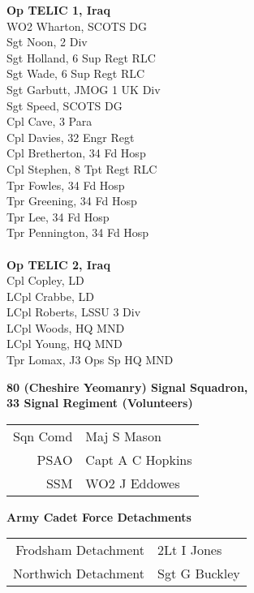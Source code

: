 \begin{multicols}{2}
  \small
  \noindent
  \textbf{Op TELIC 1, Iraq} \\
  WO2 Wharton, SCOTS DG \\
  Sgt Noon, 2 Div \\
  Sgt Holland, 6 Sup Regt RLC \\
  Sgt Wade, 6 Sup Regt RLC \\
  Sgt Garbutt, JMOG 1 UK Div \\
  Sgt Speed, SCOTS DG \\
  Cpl Cave, 3 Para \\
  Cpl Davies, 32 Engr Regt \\
  Cpl Bretherton, 34 Fd Hosp \\
  Cpl Stephen, 8 Tpt Regt RLC \\
  Tpr Fowles, 34 Fd Hosp \\
  Tpr Greening, 34 Fd Hosp \\
  Tpr Lee, 34 Fd Hosp \\
  Tpr Pennington, 34 Fd Hosp \\
  \\
  \textbf{Op TELIC 2, Iraq} \\
  Cpl Copley, LD \\
  LCpl Crabbe, LD \\
  LCpl Roberts, LSSU 3 Div \\
  LCpl Woods, HQ MND \\
  LCpl Young, HQ MND \\
  Tpr Lomax, J3 Ops Sp HQ MND \\
\end{multicols}

\pagebreak

\vspace*{10mm}

\begin{center}
  \Large
  \textbf{80 (Cheshire Yeomanry) Signal Squadron, \\ 33 Signal Regiment (Volunteers)}
\end{center}

\begin{center}
  \begin{tabular}{rl}
    Sqn Comd & Maj S Mason \\
    PSAO & Capt A C Hopkins \\
    SSM & WO2 J Eddowes \\
  \end{tabular}
\end{center}

\vspace*{10mm}

\begin{center}
  \Large
  \textbf{Army Cadet Force Detachments}
\end{center}

\begin{center}
  \begin{tabular}{rl}
    Frodsham Detachment & 2Lt I Jones \\
    Northwich Detachment & Sgt G Buckley \\
  \end{tabular}
\end{center}
